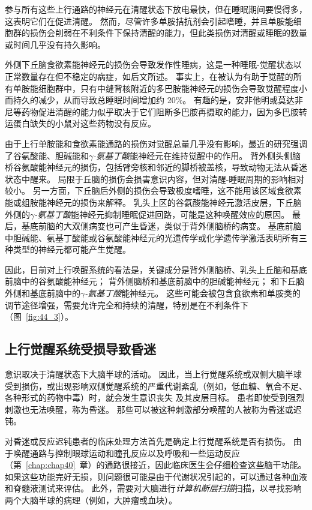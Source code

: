 参与所有这些上行通路的神经元在清醒状态下放电最快，但在睡眠期间要慢得多，这表明它们在促进清醒。
然而，尽管许多单胺拮抗剂会引起嗜睡，并且单胺能细胞群的损伤会削弱在不利条件下保持清醒的能力，但此类损伤对清醒或睡眠的数量或时间几乎没有持久影响。


外侧下丘脑食欲素能神经元的损伤会导致发作性睡病，这是一种睡眠-觉醒状态以正常数量存在但不稳定的病症，如后文所述。
事实上，在被认为有助于觉醒的所有单胺能细胞群中，只有中缝背核附近的多巴胺能神经元的损伤会导致觉醒程度小而持久的减少，从而导致总睡眠时间增加约 20\%。
有趣的是，安非他明或莫达非尼等药物促进清醒的能力似乎取决于它们阻断多巴胺再摄取的能力，因为多巴胺转运蛋白缺失的小鼠对这些药物没有反应。


由于上行单胺能和食欲素能通路的损伤对觉醒总量几乎没有影响，最近的研究强调了谷氨酸能、胆碱能和\textit{$\gamma$-氨基丁酸}能神经元在维持觉醒中的作用。
背外侧头侧脑桥谷氨酸能神经元的损伤，包括臂旁核和邻近的脚桥被盖核，导致动物无法从昏迷状态中醒来。
局限于丘脑的损伤会损害意识内容，但对清醒-睡眠周期的影响相对较小。
另一方面，下丘脑后外侧的损伤会导致极度嗜睡，这不能用该区域食欲素能或组胺能神经元的损伤来解释。
乳头上区的谷氨酸能神经元激活皮层，下丘脑外侧的\textit{$\gamma$-氨基丁酸}能神经元抑制睡眠促进回路，可能是这种唤醒效应的原因。
最后，基底前脑的大双侧病变也可产生昏迷，类似于背外侧脑桥的病变。
基底前脑中胆碱能、氨基丁酸能或谷氨酸能神经元的光遗传学或化学遗传学激活表明所有三种类型的神经元都可能产生觉醒。


因此，目前对上行唤醒系统的看法是，关键成分是背外侧脑桥、乳头上丘脑和基底前脑中的谷氨酸能神经元；
背外侧脑桥和基底前脑中的胆碱能神经元；
和下丘脑外侧和基底前脑中的\textit{$\gamma$-氨基丁酸}能神经元。
这些可能会被包含食欲素和单胺类的调节途径增强，需要允许完全和持续的清醒，特别是在不利条件下（图~\ref{fig:44_3}）。



\subsection{上行觉醒系统受损导致昏迷}

意识取决于清醒状态下大脑半球的活动。
因此，当上行觉醒系统或双侧大脑半球受到损伤，或出现影响双侧觉醒系统的严重代谢紊乱（例如，低血糖、氧合不足、各种形式的药物中毒）时，就会发生意识丧失 及其皮层目标。
患者即使受到强烈刺激也无法唤醒，称为昏迷。
那些可以被这种刺激部分唤醒的人被称为昏迷或迟钝。


对昏迷或反应迟钝患者的临床处理方法首先是确定上行觉醒系统是否有损伤。
由于唤醒通路与控制眼球运动和瞳孔反应以及呼吸和一些运动反应（第~\ref{chap:chap40}~章）的通路很接近，因此临床医生会仔细检查这些脑干功能。
如果这些功能完好无损，则问题很可能是由于代谢状况引起的，可以通过各种血液和脊髓液测试来评估。
此外，需要对大脑进行\textit{计算机断层扫描}扫描，以寻找影响两个大脑半球的病理（例如，大肿瘤或血块）。



